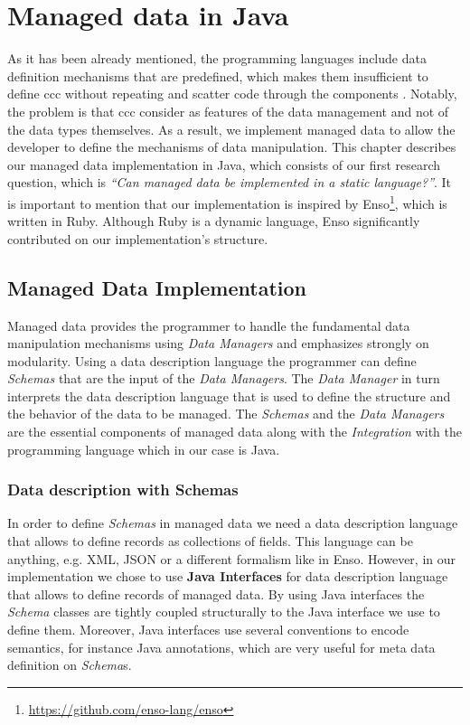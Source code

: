 
\chapter{Managed data in Java}\label{Implementation}

As it has been already mentioned, the programming languages include data definition mechanisms that are predefined, which makes them insufficient to define \ac{ccc} without repeating and scatter code through the components \cite{loh2012managed}.
Notably, the problem is that \ac{ccc} consider as features of the data management and not of the data types themselves.
As a result, we implement managed data to allow the developer to define the mechanisms of data manipulation.
This chapter describes our managed data implementation in Java, which consists of our first research question, which is \textit{``Can managed data be implemented in a static language?''}.
It is important to mention that our implementation is inspired by Enso\footnote{\url{https://github.com/enso-lang/enso}}, which is written in Ruby. 
Although Ruby is a dynamic language, Enso significantly contributed on our implementation's structure.

\section{Managed Data Implementation}\label{sec:Managed Data Implementation}
Managed data provides the programmer to handle the fundamental data manipulation mechanisms using \textit{Data Managers} and emphasizes strongly on modularity.
Using a data description language the programmer can define \textit{Schemas} that are the input of the \textit{Data Managers}. The \textit{Data Manager} in turn interprets the data description language that is used to define the structure and the behavior of the data to be managed.
The \textit{Schemas} and the \textit{Data Managers} are the essential components of managed data along with the \textit{Integration} with the programming language which in our case is Java.

\subsection{Data description with Schemas}\label{Schema Definition}
In order to define \textit{Schemas} in managed data we need a data description language that allows to define records as collections of fields. 
This language can be anything, e.g. XML, JSON or a different formalism like in Enso.
However, in our implementation we chose to use \textbf{Java Interfaces} for data description language that allows to define records of managed data.
By using Java interfaces the \textit{Schema} classes are tightly coupled structurally to the Java interface we use to define them. 
Moreover, Java interfaces use several conventions to encode semantics, for instance Java annotations, which are very useful for meta data definition on \textit{Schema}s.

